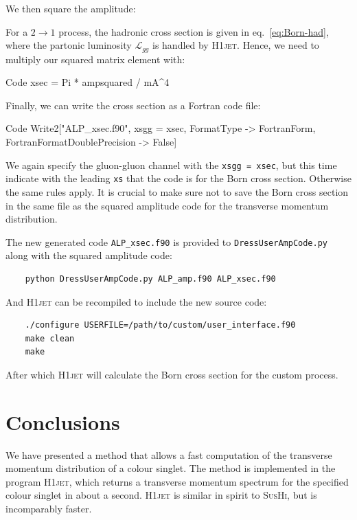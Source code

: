 \documentclass[12pt]{article}
\begin{document}
We then square the amplitude: 
For a $2 \rightarrow 1$ process, the hadronic cross section is given in eq.~\eqref{eq:Born-had}, where the partonic luminosity $\mathcal{L}_{gg}$ is handled by \textsc{H1jet}. Hence, we need to multiply our squared matrix element with:
\begin{mmaCell}{Code}
xsec = Pi * ampsquared / mA^4 
\end{mmaCell}
Finally, we can write the cross section as a Fortran code file: 
\begin{mmaCell}{Code}
Write2["ALP_xsec.f90", xsgg = xsec, FormatType -> FortranForm, FortranFormatDoublePrecision -> False] 
\end{mmaCell}
We again specify the gluon-gluon channel with the \texttt{xsgg = xsec}, but this time indicate with the leading \texttt{xs} that the code is for the Born cross section. Otherwise the same rules apply. It is crucial to make sure not to save the Born cross section in the same file as the squared amplitude code for the transverse momentum distribution. 

The new generated code \texttt{ALP\_xsec.f90} is provided to \texttt{DressUserAmpCode.py} along with the squared amplitude code: 
\begin{lstlisting}
	python DressUserAmpCode.py ALP_amp.f90 ALP_xsec.f90 
\end{lstlisting}
And \textsc{H1jet} can be recompiled to include the new source code: 
\begin{lstlisting}
	./configure USERFILE=/path/to/custom/user_interface.f90 
	make clean
	make 
\end{lstlisting}
After which \textsc{H1jet} will calculate the Born cross section for the custom process. 

\section{Conclusions}
\label{sec:the-end}

We have presented a method that allows a fast computation of the
transverse momentum distribution of a colour singlet. The method is
implemented in the program \textsc{H1jet}, which returns a transverse momentum
spectrum for the specified colour singlet in about a second. \textsc{H1jet} is
similar in spirit to \textsc{SusHi}, but is incomparably faster.
\end{document}
